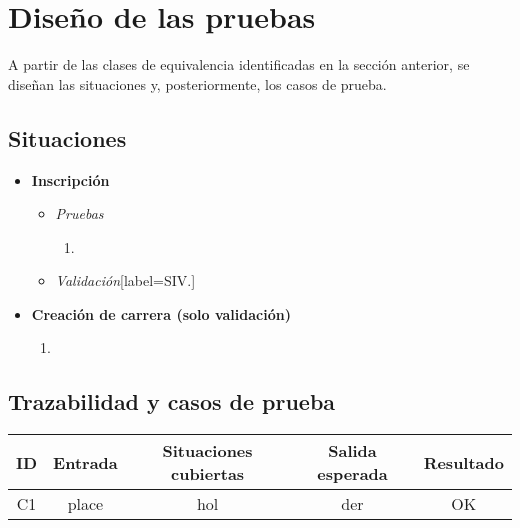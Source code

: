 \chapter{Diseño de las pruebas}
A partir de las clases de equivalencia identificadas en la sección anterior,
se diseñan las situaciones y, posteriormente, los casos de prueba.

\section{Situaciones}
\begin{itemize}
	\item \textbf{Inscripción}
		\begin{itemize}
			\item \textit{Pruebas}
				\begin{enumerate}[label*=SIP\arabic*.]
					\item
				\end{enumerate}
			\item \textit{Validación}[label=SIV\arabic*.]
		\end{itemize}
	\item \textbf{Creación de carrera (solo validación)}
		 \begin{enumerate}[label=SCV\arabic*.]
			\item
		 \end{enumerate}
\end{itemize}

\section{Trazabilidad y casos de prueba}
\begin{table}[ht]
	\centering
	\begin{tabular}{|c|c|c|c|c|}
		\hline
		\textbf{ID} & \textbf{Entrada} & \textbf{Situaciones cubiertas} & \textbf{Salida esperada} & \textbf{Resultado} \\
		\hline
		C1 & place & hol & der & \cellcolor{green!25} OK \\
		\hline
	\end{tabular}
\end{table}
